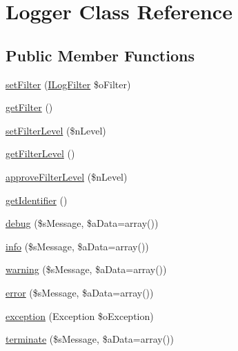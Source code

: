 \hypertarget{class_logger}{\section{Logger Class Reference}
\label{class_logger}
}
\subsection*{Public Member Functions}
\begin{DoxyCompactItemize}
\item 
\hyperlink{class_logger_a54e5e4ead59460c6345d38ed4385e3fc}{set\-Filter} (\hyperlink{interface_i_log_filter}{I\-Log\-Filter} \$o\-Filter)
\item 
\hyperlink{class_logger_a71d1988b4a05424766640f00cc0c5ec4}{get\-Filter} ()
\item 
\hyperlink{class_logger_ad960882fc5dd94fe18c9d0417c3985f2}{set\-Filter\-Level} (\$n\-Level)
\item 
\hyperlink{class_logger_aaffe36d440a09bceb9f27f7667fd7625}{get\-Filter\-Level} ()
\item 
\hyperlink{class_logger_abd297d3ef221a659a8d045a32d068959}{approve\-Filter\-Level} (\$n\-Level)
\item 
\hyperlink{class_logger_a4048fbdd126bfa83c8055b56647c226e}{get\-Identifier} ()
\item 
\hyperlink{class_logger_ad978807155d0ef809516b07e6a9c8038}{debug} (\$s\-Message, \$a\-Data=array())
\item 
\hyperlink{class_logger_a7f5530064ae6bc2f1cc65c602e0d817b}{info} (\$s\-Message, \$a\-Data=array())
\item 
\hyperlink{class_logger_ae7113cceb70aca732f04eb561ca46234}{warning} (\$s\-Message, \$a\-Data=array())
\item 
\hyperlink{class_logger_a72684fdf8f0b376067092d448c627b41}{error} (\$s\-Message, \$a\-Data=array())
\item 
\hyperlink{class_logger_a902fc7ccc16f872126f96c5f1c459193}{exception} (Exception \$o\-Exception)
\item 
\hyperlink{class_logger_ad2c4a0987a107ccdfe2676d5c7daa0c6}{terminate} (\$s\-Message, \$a\-Data=array())
\end{DoxyCompactItemize}
